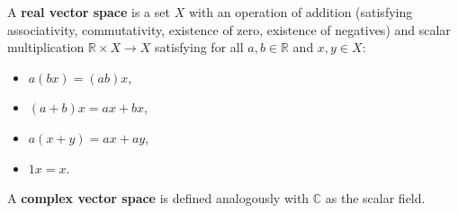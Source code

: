 A \textbf{real vector space} is a set $X$ with an operation of addition (satisfying associativity, commutativity, existence of zero, existence of negatives) and scalar multiplication $\mathbb{R} \times X \to X$ satisfying for all $a, b \in \mathbb{R}$ and $x, y \in X$:
\begin{itemize}
\item[V5.] $a(bx) = (ab)x$,
\item[V6.] $(a + b)x = ax + bx$,
\item[V7.] $a(x + y) = ax + ay$,
\item[V8.] $1x = x$.
\end{itemize}
A \textbf{complex vector space} is defined analogously with $\mathbb{C}$ as the scalar field.
